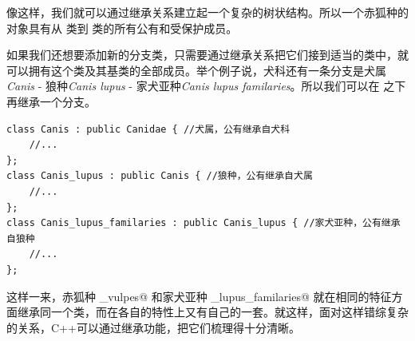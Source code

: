 像这样，我们就可以通过继承关系建立起一个复杂的树状结构。所以一个赤狐种的对象具有从 \lstinline@Eukarya@ 类到 \lstinline@Vulpes@ 类的所有公有和受保护成员。\par
如果我们还想要添加新的分支类，只需要通过继承关系把它们接到适当的类中，就可以拥有这个类及其基类的全部成员。举个例子说，犬科还有一条分支是犬属\textit{Canis} - 狼种\textit{Canis lupus} - 家犬亚种\textit{Canis lupus familaries}。所以我们可以在 \lstinline@Canidae@ 之下再继承一个分支。
\begin{lstlisting}
class Canis : public Canidae { //犬属，公有继承自犬科
    //...
};
class Canis_lupus : public Canis { //狼种，公有继承自犬属
    //...
};
class Canis_lupus_familaries : public Canis_lupus { //家犬亚种，公有继承自狼种
    //...
};
\end{lstlisting}\par
这样一来，赤狐种 \lstinline@Vulpes_vulpes@ 和家犬亚种 \lstinline@Canis_lupus_familaries@ 就在相同的特征方面继承同一个类，而在各自的特性上又有自己的一套。就这样，面对这样错综复杂的关系，C++可以通过继承功能，把它们梳理得十分清晰。\par
